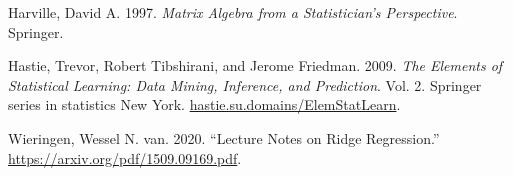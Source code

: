\documentclass[
  letterpaper,
  DIV=11,
  numbers=noendperiod]{scrartcl}
\newlength{\cslhangindent}
\newlength{\cslentryspacingunit} %
\newenvironment{CSLReferences}[2] %
 {%
  \setlength{\parindent}{0pt}
  \ifodd #1
  \let\oldpar\par
  \def\par{\hangindent=\cslhangindent\oldpar}
  \fi
  \setlength{\parskip}{#2\cslentryspacingunit}
 }%
 {}
\begin{document}
\hypertarget{refs}{}
\begin{CSLReferences}{1}{0}
\leavevmode{}%
Harville, David A. 1997. \emph{Matrix Algebra from a Statistician's
Perspective}. Springer.

\leavevmode{}%
Hastie, Trevor, Robert Tibshirani, and Jerome Friedman. 2009. \emph{The
Elements of Statistical Learning: Data Mining, Inference, and
Prediction}. Vol. 2. Springer series in statistics New York.
\href{https://hastie.su.domains/ElemStatLearn}{hastie.su.domains/ElemStatLearn}.

\leavevmode{}%
Wieringen, Wessel N. van. 2020. {``Lecture Notes on Ridge Regression.''}
\url{https://arxiv.org/pdf/1509.09169.pdf}.

\end{CSLReferences}
\end{document}

